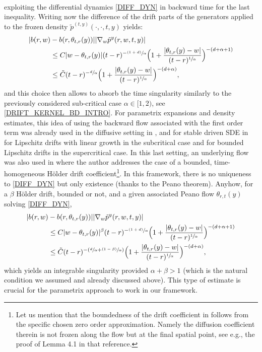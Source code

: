 \documentclass[11pt]{article}
\newcommand{\eg}{e.g.,\xspace}
\numberwithin{equation}{section}\providecommand{\asymp}{\mathrel{\sim}}
\newcommand{\psfrac}[2]{\sfrac{(#1)}{#2}}
\theoremstyle{plain}
\theoremstyle{definition}
\newcommand\1{{\mathbf{1}}}
\begin{document}
{\begin{align*}
\end{align*}
exploiting the differential dynamics \eqref{DIFF_DYN} in backward time for the last inequality.
Writing now the difference of the drift parts of the generators applied to the frozen density $\tilde p^{(t,y)}(\cdot,\cdot,t,y)$ yields:
\begin{align*}
|b(r,w)&-b(r,\theta_{t,r}(y))||\nabla_w \tilde p^y(r,w,t,y)|\\
&\le  C |w-\theta_{t,r}(y)|(t-r)^{-\psfrac{1+d}\alpha}\Bigl(1+\frac{|\theta_{t,r}(y)-w|}{(t-r)^{\sfrac 1\alpha}}\Bigr)^{-(d+\alpha+1)}\\
&\le  \tilde C (t-r)^{-\sfrac{d}\alpha}\Bigl(1+\frac{|\theta_{t,r}(y)-w|}{(t-r)^{\sfrac 1\alpha}}\Bigr)^{-(d+\alpha)},
\end{align*}
and this choice then allows to absorb the time singularity similarly to the previously considered sub-critical case $\alpha\in [1,2) $, see \eqref{DRIFT_KERNEL_BD_INTRO}. For parametrix expansions and density estimates, this idea of using the backward flow associated with the first order term was already used in the diffusive setting in \cite{kona:meno:molc:10}, \cite{dela:meno:10} and for stable driven SDE in~\cite{huan:15} for Lipschitz drifts with linear growth in the subcritical case and \cite{knop:kuli:18} for bounded Lipschitz drifts in the supercritical case. In this last setting, an underlying flow was also used in \cite{kuli:19} where the author addresses the case of a bounded, time-homogeneous Hölder drift coefficient\footnote{Let us mention that the boundedness of the drift coefficient in \cite{kuli:19} follows from the specific chosen zero order approximation. Namely the diffusion coefficient therein is not frozen along the flow but at the final spatial point, see \eg the proof of Lemma 4.1 in that reference.}. In this framework, there is no uniqueness to \eqref{DIFF_DYN} but only existence (thanks to the Peano theorem). Anyhow, for a $\beta$ Hölder drift, bounded or not, and a given associated Peano flow $\theta_{r,t}(y) $ solving \eqref{DIFF_DYN},
\begin{equation}\label{DRIFT_KERNEL_BD_INTRO_BD_FLOW}
\begin{aligned}
|b(r,w)&-b(r,\theta_{t,r}(y))||\nabla_w \tilde p^y(r,w,t,y)|\\
&\le  C |w-\theta_{t,r}(y)|^\beta(t-r)^{-\psfrac{1+d}\alpha}\Bigl(1+\frac{|\theta_{t,r}(y)-w|}{(t-r)^{\sfrac 1\alpha}}\Bigr)^{-(d+\alpha+1)}\\
&\le  \tilde C (t-r)^{-(\sfrac{d}\alpha+\psfrac{1-\beta}{\alpha} )}\Bigl(1+\frac{|\theta_{t,r}(y)-w|}{(t-r)^{\sfrac 1\alpha}}\Bigr)^{-(d+\alpha)},
\end{aligned}
\end{equation}
which yields an integrable singularity provided $\alpha+\beta>1 $ (which is the natural condition we assumed and already discussed above). This type of estimate is crucial for the parametrix approach to work in our framework.}
\end{document}
